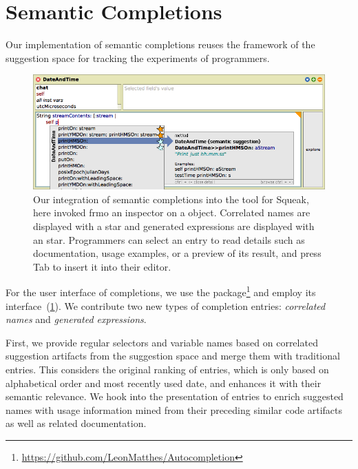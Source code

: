 
\section{Semantic Completions}
\label{sec:implementation/completions}

Our implementation of semantic completions reuses the framework of the suggestion space for tracking the experiments of programmers.

\begin{figure}
	\centering
	\includegraphics[width=\textwidth]{02_completions/screenshot.png} %
	\caption[Our integration of semantic completions into the  tool for Squeak.]{
		Our integration of semantic completions into the  tool for Squeak, here invoked frmo an inspector on a  object.
		Correlated names are displayed with a \bold{\textcolor[HTML]{598db3}{blue}} star and generated expressions are displayed with an \bold{\textcolor{orange!80!black}{orange}} star.
		Programmers can select an entry to read details such as documentation, usage examples, or a preview of its result, and press Tab to insert it into their editor.
	}
	\label{fig:implementation/completions}
\end{figure}

For the user interface of completions, we use the  package\footnote{\url{https://github.com/LeonMatthes/Autocompletion}} and employ its  interface~(\cref{fig:implementation/completions}).
We contribute two new types of completion entries: \emph{correlated names} and \emph{generated expressions}.

First, we provide regular selectors and variable names based on correlated suggestion artifacts from the suggestion space and merge them with traditional  entries.
This considers the original ranking of entries, which is only based on alphabetical order and most recently used date, and enhances it with their semantic relevance.
We hook into the presentation of entries to enrich suggested names with usage information mined from their preceding similar code artifacts as well as related documentation.

